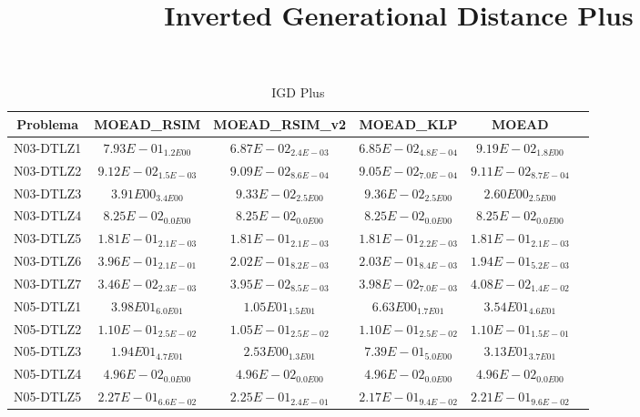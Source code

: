 \documentclass{article}
\title{Inverted Generational Distance Plus}
\author{}
\begin{document}
\maketitle
\begin{table*}[ht!]
\scriptsize
\caption{IGD Plus}
\centering\begin{tabular}{|c||c||c||c||c||c|} \hline
Problema &MOEAD_RSIM &MOEAD_RSIM_v2 &MOEAD_KLP &MOEAD\\\hline
N03-DTLZ1 &$7.93E-01_{1.2E00}$ &\cellcolor{gray25}$6.87E-02_{2.4E-03}$ &\cellcolor{gray95}$6.85E-02_{4.8E-04}$ &$9.19E-02_{1.8E00}$\\ 
\hline
N03-DTLZ2 &$9.12E-02_{1.5E-03}$ &\cellcolor{gray25}$9.09E-02_{8.6E-04}$ &\cellcolor{gray95}$9.05E-02_{7.0E-04}$ &$9.11E-02_{8.7E-04}$\\ 
\hline
N03-DTLZ3 &$3.91E00_{3.4E00}$ &\cellcolor{gray95}$9.33E-02_{2.5E00}$ &\cellcolor{gray25}$9.36E-02_{2.5E00}$ &$2.60E00_{2.5E00}$\\ 
\hline
N03-DTLZ4 &\cellcolor{gray95}$8.25E-02_{0.0E00}$ &\cellcolor{gray25}$8.25E-02_{0.0E00}$ &$8.25E-02_{0.0E00}$ &$8.25E-02_{0.0E00}$\\ 
\hline
N03-DTLZ5 &\cellcolor{gray25}$1.81E-01_{2.1E-03}$ &$1.81E-01_{2.1E-03}$ &\cellcolor{gray95}$1.81E-01_{2.2E-03}$ &$1.81E-01_{2.1E-03}$\\ 
\hline
N03-DTLZ6 &$3.96E-01_{2.1E-01}$ &\cellcolor{gray25}$2.02E-01_{8.2E-03}$ &$2.03E-01_{8.4E-03}$ &\cellcolor{gray95}$1.94E-01_{5.2E-03}$\\ 
\hline
N03-DTLZ7 &\cellcolor{gray95}$3.46E-02_{2.3E-03}$ &\cellcolor{gray25}$3.95E-02_{8.5E-03}$ &$3.98E-02_{7.0E-03}$ &$4.08E-02_{1.4E-02}$\\ 
\hline
N05-DTLZ1 &$3.98E01_{6.0E01}$ &\cellcolor{gray25}$1.05E01_{1.5E01}$ &\cellcolor{gray95}$6.63E00_{1.7E01}$ &$3.54E01_{4.6E01}$\\ 
\hline
N05-DTLZ2 &\cellcolor{gray25}$1.10E-01_{2.5E-02}$ &\cellcolor{gray95}$1.05E-01_{2.5E-02}$ &$1.10E-01_{2.5E-02}$ &$1.10E-01_{1.5E-01}$\\ 
\hline
N05-DTLZ3 &$1.94E01_{4.7E01}$ &\cellcolor{gray25}$2.53E00_{1.3E01}$ &\cellcolor{gray95}$7.39E-01_{5.0E00}$ &$3.13E01_{3.7E01}$\\ 
\hline
N05-DTLZ4 &\cellcolor{gray95}$4.96E-02_{0.0E00}$ &\cellcolor{gray25}$4.96E-02_{0.0E00}$ &$4.96E-02_{0.0E00}$ &$4.96E-02_{0.0E00}$\\ 
\hline
N05-DTLZ5 &$2.27E-01_{6.6E-02}$ &$2.25E-01_{2.4E-01}$ &\cellcolor{gray95}$2.17E-01_{9.4E-02}$ &\cellcolor{gray25}$2.21E-01_{9.6E-02}$\\ 

\end{tabular}
\end{table*}
\end{document}
